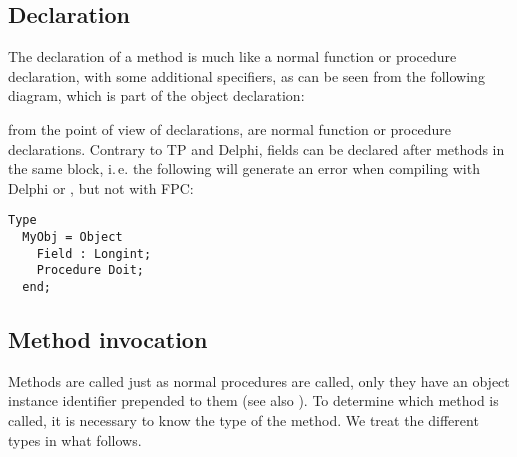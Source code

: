 \subsection{Declaration}
The declaration of a method is much like a normal function or procedure
declaration, with some additional specifiers, as can be seen from the
following diagram, which is part of the object declaration:

from the point of view of declarations,  are
normal function or procedure declarations.
Contrary to TP and Delphi, fields can be declared after methods in the same
block, i.\,e. the following will generate an error when compiling with Delphi
or \tp, but not with FPC:
\begin{verbatim}
Type
  MyObj = Object
    Field : Longint;
    Procedure Doit;
  end;
\end{verbatim}


\subsection{Method invocation}
Methods are called just as normal procedures are called, only they have an
object instance identifier prepended to them (see also ).
To determine which method is called, it is necessary to know the type of
the method. We treat the different types in what follows.

